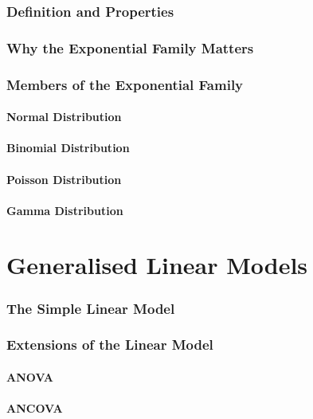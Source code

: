 \documentclass[12pt,a4paper]{report}
\begin{document}
\section{Definition and Properties}
%

\section{Why the Exponential Family Matters}
%

\section{Members of the Exponential Family}
\subsection{Normal Distribution}
\subsection{Binomial Distribution}
\subsection{Poisson Distribution}
\subsection{Gamma Distribution}

\part{Generalised Linear Models}

\section{The Simple Linear Model}
%

\section{Extensions of the Linear Model}
\subsection{ANOVA}
\subsection{ANCOVA}
\end{document}

